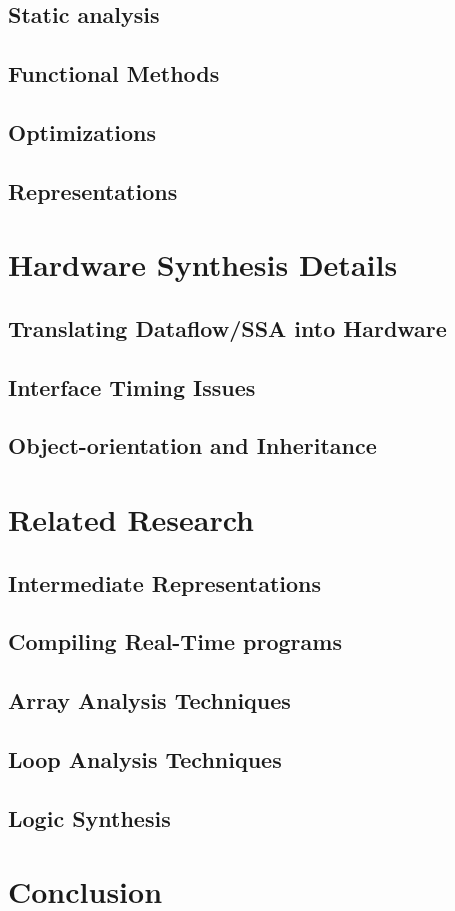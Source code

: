 \documentclass[10pt,notitlepage,twocolumn]{article}
\begin{document}
\subsection{Static analysis} %
\subsection{Functional Methods}
\subsection{Optimizations}
\subsection{Representations}
\section{Hardware Synthesis Details}
\subsection{Translating Dataflow/SSA into Hardware}
\subsection{Interface Timing Issues}
\subsection{Object-orientation and Inheritance}
\section{Related Research}
\subsection{Intermediate Representations}
\subsection{Compiling Real-Time programs}
\subsection{Array Analysis Techniques}
\subsection{Loop Analysis Techniques}
\subsection{Logic Synthesis}
\section{Conclusion}


\end{document}

